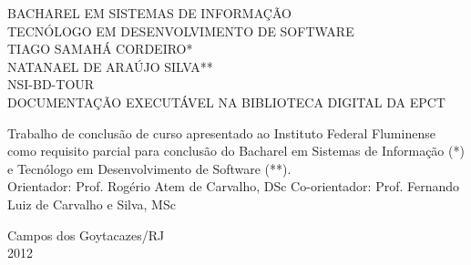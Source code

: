 \begin{titlepage}
 \begin{figure}[ht]
 \centering
 \end{figure}
 \begin{center}
   {\large BACHAREL EM SISTEMAS DE INFORMAÇÃO} \\
   {\large TECNÓLOGO EM DESENVOLVIMENTO DE SOFTWARE} \\ [3.5cm]
   {\large TIAGO SAMAHÁ CORDEIRO*} \\
   {\large NATANAEL DE ARAÚJO SILVA**} \\ [3cm]
   {\large NSI-BD-TOUR}\\ [0.5cm]
   {\small DOCUMENTAÇÃO EXECUTÁVEL NA BIBLIOTECA DIGITAL DA EPCT} \\ [2.5cm]
   \hspace{.45\textwidth} %
   \begin{minipage}{0.53\textwidth}
   \begin{espacosimples}
      Trabalho de conclusão de curso apresentado ao Instituto Federal Fluminense como requisito parcial para conclusão do Bacharel em Sistemas de Informação (*) e Tecnólogo em Desenvolvimento de Software (**).\\[1.5cm]
      Orientador: Prof. Rogério Atem de Carvalho, DSc
      Co-orientador: Prof. Fernando Luiz de Carvalho e Silva, MSc
    \end{espacosimples}
    \end{minipage}
   \vfill
   {\large Campos dos Goytacazes/RJ} \\
   {\large 2012}
 \end{center}
\end{titlepage}